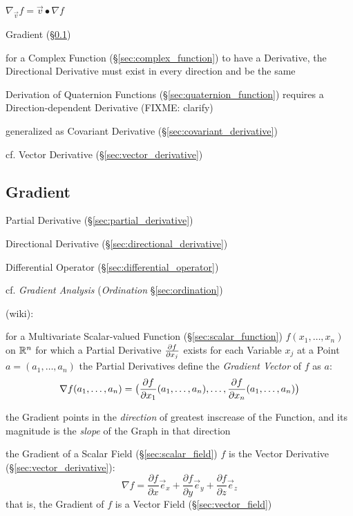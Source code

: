 $\nabla_{\vec{v}} f = \vec{v}\bullet \nabla{f}$

Gradient (\S\ref{sec:gradient})

for a Complex Function (\S\ref{sec:complex_function}) to have a Derivative, the
Directional Derivative must exist in every direction and be the same

Derivation of Quaternion Functions (\S\ref{sec:quaternion_function}) requires a
Direction-dependent Derivative (FIXME: clarify)

\fist generalized as Covariant Derivative (\S\ref{sec:covariant_derivative})

cf. Vector Derivative (\S\ref{sec:vector_derivative})



\subsection{Gradient}\label{sec:gradient}

Partial Derivative (\S\ref{sec:partial_derivative})

Directional Derivative (\S\ref{sec:directional_derivative})

Differential Operator (\S\ref{sec:differential_operator})

cf. \emph{Gradient Analysis} (\emph{Ordination} \S\ref{sec:ordination})

(wiki):

for a Multivariate Scalar-valued Function (\S\ref{sec:scalar_function}) $f(x_1,
\ldots, x_n)$ on $\mathbb{R}^n$ for which a Partial Derivative $\frac{\partial{f}}{\partial{x_j}}$
exists for each Variable $x_j$ at a Point $a = (a_1, \ldots, a_n)$ the Partial
Derivatives define the \emph{Gradient Vector} of $f$ as $a$:
\[
  \nabla{f}(a_1, \ldots, a_n) = \big( \frac{\partial{f}}{\partial{x_1}}(a_1, \ldots, a_n), \ldots,
  \frac{\partial{f}}{\partial{x_n}}(a_1, \ldots, a_n) \big)
\]

the Gradient points in the \emph{direction} of greatest inscrease of the
Function, and its magnitude is the \emph{slope} of the Graph in that direction

the Gradient of a Scalar Field (\S\ref{sec:scalar_field}) $f$ is the Vector
Derivative (\S\ref{sec:vector_derivative}):
\[
  \nabla f =
    \frac{\partial f}{\partial x}\vec{e}_x +
    \frac{\partial f}{\partial y}\vec{e}_y +
    \frac{\partial f}{\partial z}\vec{e}_z
\]
that is, the Gradient of $f$ is a Vector Field (\S\ref{sec:vector_field})

